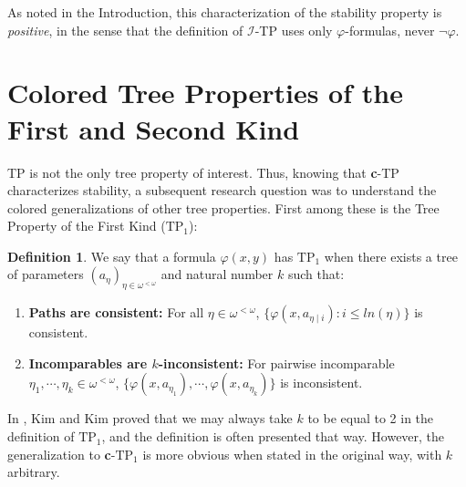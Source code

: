 \documentclass{article}
\newcommand{\calI}{\mathcal{I}}
\newcommand{\TPi}{\text{TP}_1}
\newcommand{\vphi}{\varphi}
\theoremstyle{definition}
\newtheorem{definition}{Definition}
\theoremstyle{definition}
\theoremstyle{definition}
\theoremstyle{definition}
\begin{document}
As noted in the Introduction, this characterization of the stability property is \textit{positive}, in the sense that the definition of $\calI$-TP uses only $\vphi$-formulas, never $\neg\vphi$.

\section{Colored Tree Properties of the First and Second Kind}

TP is not the only tree property of interest. Thus, knowing that \textbf{c}-TP characterizes stability, a subsequent research question was to understand the colored generalizations of other tree properties. First among these is the Tree Property of the First Kind ($\TPi$):


\begin{definition}{}\label{TP1 definition}
        We say that a formula $\vphi(x,y)$ has $\text{TP}_1$ when there exists a tree of parameters $(a_\eta)_{\eta\in \omega^{<\omega}}$ and natural number $k$ such that:

        \begin{enumerate}
    \item \textbf{Paths are consistent:} For all $\eta\in\omega^{<\omega}$, $\{\vphi(x, a_{\eta\mid i})\colon i\leq ln(\eta)\}$ is consistent.

   \item \textbf{Incomparables are $k$-inconsistent:} For pairwise incomparable $\eta_1,\dotsm, \eta_k\in\omega^{<\omega}$, $\{\vphi(x,a_{\eta_1}),\dotsm, \vphi(x,a_{\eta_k})\}$ is inconsistent.

\end{enumerate}
\end{definition}

In \cite{Kim_Kim_Notions_Around_TP1}, Kim and Kim proved that we may always take $k$ to be equal to 2 in the definition of $\TPi$, and the definition is often presented that way. However, the generalization to \textbf{c}-$\TPi$ is more obvious when stated in the original way, with $k$ arbitrary.
\end{document}
